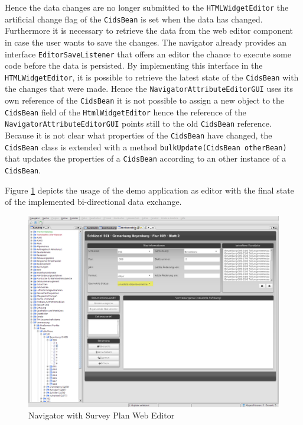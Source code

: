 Hence the data changes are no longer submitted to the \texttt{HTMLWidgetEditor} the artificial change flag of the \texttt{CidsBean} is set when the data has changed. 
Furthermore it is necessary to retrieve the data from the web editor component in case the user wants to save the changes. 
The navigator already provides an interface \texttt{EditorSaveListener} that offers an editor the chance to execute some code before the data is persisted. 
By implementing this interface in the \texttt{HTMLWidgetEditor}, it is possible to retrieve the latest state of the \texttt{CidsBean} with the changes that were made. 
Hence the \texttt{NavigatorAttributeEditorGUI} uses its own reference of the \texttt{CidsBean} it is not possible to assign a new object to the \texttt{CidsBean} field of the \texttt{HtmlWidgetEditor} hence the reference of the \texttt{NavigatorAttributeEditorGUI} points still to the old \texttt{CidsBean} reference. 
Because it is not clear what properties of the \texttt{CidsBean} have changed, the \texttt{CidsBean} class is extended with a method \texttt{bulkUpdate(CidsBean otherBean)} that updates the properties of a \texttt{CidsBean} according to an other instance of a \texttt{CidsBean}. 

Figure \ref{fig:nav_web_editor} depicts the usage of the demo application as editor with the final state of the implemented bi-directional data exchange.

\begin{figure}
	\centering	\includegraphics[width=1.0\textwidth]{./img/impl/navigator_web_editor.png}
	\caption{Navigator with Survey Plan Web Editor}
	\label{fig:nav_web_editor}
\end{figure}


